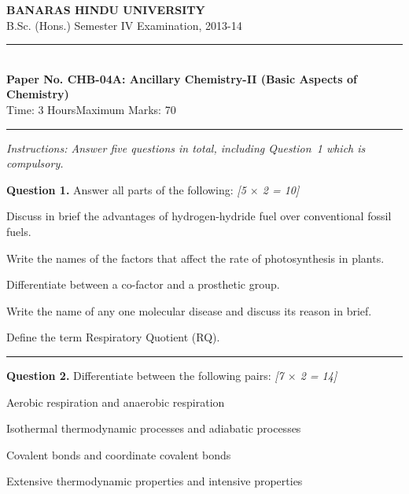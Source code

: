 \documentclass[11pt,a4paper]{article}
\newcommand{\pts}[1]{\hfill   \textit{[#1]}}
\begin{document}
\begin{center}
  {\large\bfseries BANARAS HINDU UNIVERSITY}\\[2pt]
  {\normalsize B.Sc. (Hons.) Semester IV Examination, 2013-14}\\[6pt]
  \rule{0.8\linewidth}{0.5pt}\\[6pt]
  {\large\bfseries Paper No. CHB-04A: Ancillary Chemistry-II (Basic Aspects of Chemistry)}\\[4pt]
  {\normalsize Time: 3 Hours\hfill Maximum Marks: 70}
\end{center}
\rule{\linewidth}{0.4pt}
\small



\noindent   \textit{Instructions: Answer five questions in total, including Question~1 which is compulsory.}

\normalsize
\bigskip




\noindent   \textbf{Question 1.} Answer all parts of the following: \pts{5 $ \times$ 2 = 10}

\begin{parts}
  \item Discuss in brief the advantages of hydrogen-hydride fuel over conventional fossil fuels.
  \item Write the names of the factors that affect the rate of photosynthesis in plants.
  \item Differentiate between a co-factor and a prosthetic group.
  \item Write the name of any one molecular disease and discuss its reason in brief.
  \item Define the term Respiratory Quotient (RQ).
\end{parts}

\medskip\rule{\linewidth}{0.2pt}




\noindent   \textbf{Question 2.} Differentiate between the following pairs: \pts{7 $ \times$ 2 = 14}

\begin{parts}
  \item Aerobic respiration and anaerobic respiration
  \item Isothermal thermodynamic processes and adiabatic processes
  \item Covalent bonds and coordinate covalent bonds
  \item Extensive thermodynamic properties and intensive properties
\end{parts}
\end{document}
